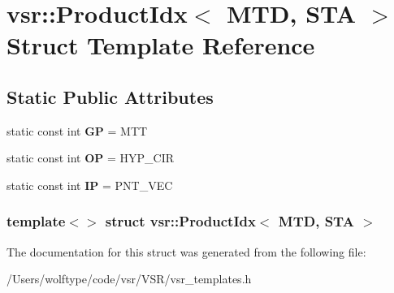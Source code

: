 \hypertarget{structvsr_1_1_product_idx_3_01_m_t_d_00_01_s_t_a_01_4}{\section{vsr\-:\-:Product\-Idx$<$ M\-T\-D, S\-T\-A $>$ Struct Template Reference}
\label{structvsr_1_1_product_idx_3_01_m_t_d_00_01_s_t_a_01_4}
}
\subsection*{Static Public Attributes}
\begin{DoxyCompactItemize}
\item 
\hypertarget{structvsr_1_1_product_idx_3_01_m_t_d_00_01_s_t_a_01_4_ad88b89d9a5a4576c2bf32fdfb344f21c}{static const int {\bfseries G\-P} = M\-T\-T}\label{structvsr_1_1_product_idx_3_01_m_t_d_00_01_s_t_a_01_4_ad88b89d9a5a4576c2bf32fdfb344f21c}

\item 
\hypertarget{structvsr_1_1_product_idx_3_01_m_t_d_00_01_s_t_a_01_4_a8281ca659e762d310d122f2277f72efc}{static const int {\bfseries O\-P} = H\-Y\-P\-\_\-\-C\-I\-R}\label{structvsr_1_1_product_idx_3_01_m_t_d_00_01_s_t_a_01_4_a8281ca659e762d310d122f2277f72efc}

\item 
\hypertarget{structvsr_1_1_product_idx_3_01_m_t_d_00_01_s_t_a_01_4_af421ceaf1f3d78f6cc287adddc78ae85}{static const int {\bfseries I\-P} = P\-N\-T\-\_\-\-V\-E\-C}\label{structvsr_1_1_product_idx_3_01_m_t_d_00_01_s_t_a_01_4_af421ceaf1f3d78f6cc287adddc78ae85}

\end{DoxyCompactItemize}
\subsubsection*{template$<$$>$ struct vsr\-::\-Product\-Idx$<$ M\-T\-D, S\-T\-A $>$}



The documentation for this struct was generated from the following file\-:\begin{DoxyCompactItemize}
\item 
/\-Users/wolftype/code/vsr/\-V\-S\-R/vsr\-\_\-templates.\-h\end{DoxyCompactItemize}
